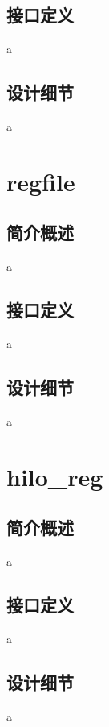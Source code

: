     \subsection{接口定义}
    a

    \subsection{设计细节}
    a

\section{regfile}

    \subsection{简介概述}
    a

    \subsection{接口定义}
    a

    \subsection{设计细节}
    a

\section{hilo\_reg}

    \subsection{简介概述}
    a

    \subsection{接口定义}
    a

    \subsection{设计细节}
    a
